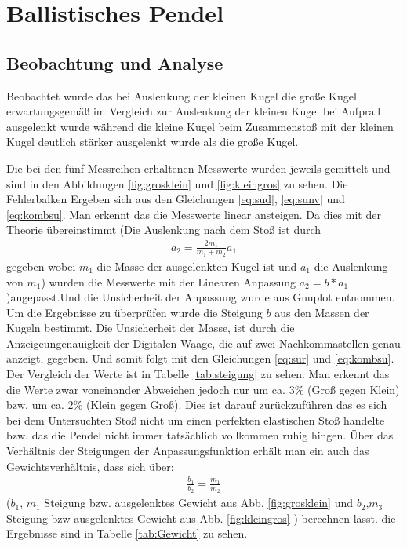 \section{Ballistisches Pendel}
\subsection*{Beobachtung und Analyse}
Beobachtet wurde das bei Auslenkung der kleinen Kugel die große Kugel erwartungsgemäß im Vergleich zur Auslenkung der kleinen Kugel bei Aufprall ausgelenkt wurde während die kleine Kugel beim Zusammenstoß mit der kleinen Kugel deutlich stärker ausgelenkt wurde als die große Kugel.

Die bei den fünf Messreihen erhaltenen Messwerte wurden jeweils gemittelt und sind in den Abbildungen \ref{fig:grosklein} und \ref{fig:kleingros} zu sehen. Die Fehlerbalken Ergeben sich aus den Gleichungen \ref{eq:sud}, \ref{eq:sunv} und \ref{eq:kombsu}. 
Man erkennt das die Messwerte linear ansteigen. Da dies mit der Theorie übereinstimmt (Die Auslenkung nach dem Stoß ist durch
\begin{align}
	a_2= \frac{2m_1}{m_1+m_2} a_1\label{eq:Auslenkung}
\end{align} 
gegeben wobei $m_1$ die Masse der ausgelenkten Kugel ist und $a_1$ die Auslenkung von $m_1$)
wurden die Messwerte mit der Linearen Anpassung $a_2=b*a_1$)angepasst.Und die Unsicherheit der Anpassung wurde aus Gnuplot entnommen.
Um die Ergebnisse zu überprüfen wurde die Steigung $b$ aus den Massen der Kugeln bestimmt. Die Unsicherheit der Masse, ist durch die Anzeigeungenauigkeit der Digitalen Waage, die auf zwei Nachkommastellen genau anzeigt, gegeben. Und somit folgt mit den Gleichungen \ref{eq:sur} und \ref{eq:kombsu}. Der Vergleich der Werte ist in Tabelle \ref{tab:steigung} zu sehen.
Man erkennt das die Werte zwar voneinander Abweichen jedoch nur um ca. $3\%$ (Groß gegen Klein) bzw. um ca. $2\%$ (Klein gegen Groß). Dies ist darauf zurückzuführen das es sich bei dem Untersuchten Stoß nicht um einen perfekten elastischen Stoß handelte bzw. das die Pendel nicht immer tatsächlich vollkommen ruhig hingen.
Über das Verhältnis der Steigungen der Anpassungsfunktion erhält man ein auch das Gewichtsverhältnis, dass sich über: 
\begin{align}
\frac{b_1}{b_2}=\frac{m_1}{m_2}	
\end{align} 
($b_1$, $m_1$ Steigung bzw. ausgelenktes Gewicht aus Abb. \ref{fig:grosklein} und $b_2$,$m_3$ Steigung bzw ausgelenktes Gewicht aus Abb. \ref{fig:kleingros} ) berechnen lässt. die Ergebnisse sind in Tabelle \ref{tab:Gewicht} zu sehen.

